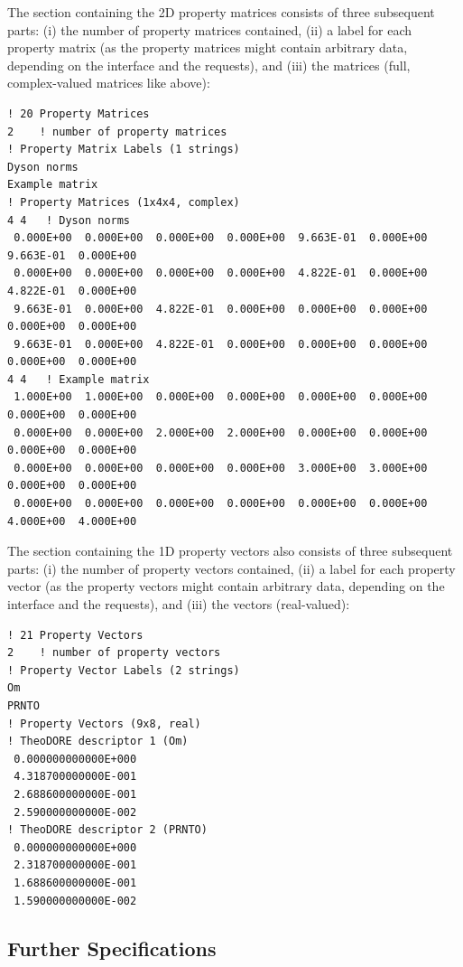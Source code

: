 \documentclass[a4paper,10pt,DIV=15,openany]{scrbook}
\newenvironment{example}{
  \setlength{\OuterFrameSep}{3pt}
  \vspace{0mm}
  \definecolor{shadecolor}{HTML}{E4F4FF}
  \begin{shaded}
}{
  \end{shaded}
}
\begin{document}
The section containing the 2D property matrices consists of three subsequent parts: (i) the number of property matrices contained, (ii) a label for each property matrix (as the property matrices might contain arbitrary data, depending on the interface and the requests), and (iii) the matrices (full, complex-valued matrices like above):
\begin{example}
  \begin{verbatim}
! 20 Property Matrices
2    ! number of property matrices
! Property Matrix Labels (1 strings)
Dyson norms
Example matrix
! Property Matrices (1x4x4, complex)
4 4   ! Dyson norms
 0.000E+00  0.000E+00  0.000E+00  0.000E+00  9.663E-01  0.000E+00  9.663E-01  0.000E+00 
 0.000E+00  0.000E+00  0.000E+00  0.000E+00  4.822E-01  0.000E+00  4.822E-01  0.000E+00 
 9.663E-01  0.000E+00  4.822E-01  0.000E+00  0.000E+00  0.000E+00  0.000E+00  0.000E+00 
 9.663E-01  0.000E+00  4.822E-01  0.000E+00  0.000E+00  0.000E+00  0.000E+00  0.000E+00 
4 4   ! Example matrix
 1.000E+00  1.000E+00  0.000E+00  0.000E+00  0.000E+00  0.000E+00  0.000E+00  0.000E+00 
 0.000E+00  0.000E+00  2.000E+00  2.000E+00  0.000E+00  0.000E+00  0.000E+00  0.000E+00 
 0.000E+00  0.000E+00  0.000E+00  0.000E+00  3.000E+00  3.000E+00  0.000E+00  0.000E+00 
 0.000E+00  0.000E+00  0.000E+00  0.000E+00  0.000E+00  0.000E+00  4.000E+00  4.000E+00 
\end{verbatim}
\end{example}

The section containing the 1D property vectors also consists of three subsequent parts: (i) the number of property vectors contained, (ii) a label for each property vector (as the property vectors might contain arbitrary data, depending on the interface and the requests), and (iii) the vectors (real-valued):
\begin{example}
  \begin{verbatim}
! 21 Property Vectors
2    ! number of property vectors
! Property Vector Labels (2 strings)
Om
PRNTO
! Property Vectors (9x8, real)
! TheoDORE descriptor 1 (Om)
 0.000000000000E+000
 4.318700000000E-001
 2.688600000000E-001
 2.590000000000E-002
! TheoDORE descriptor 2 (PRNTO)
 0.000000000000E+000
 2.318700000000E-001
 1.688600000000E-001
 1.590000000000E-002
\end{verbatim}
\end{example}



\subsection{Further Specifications}
\end{document}
